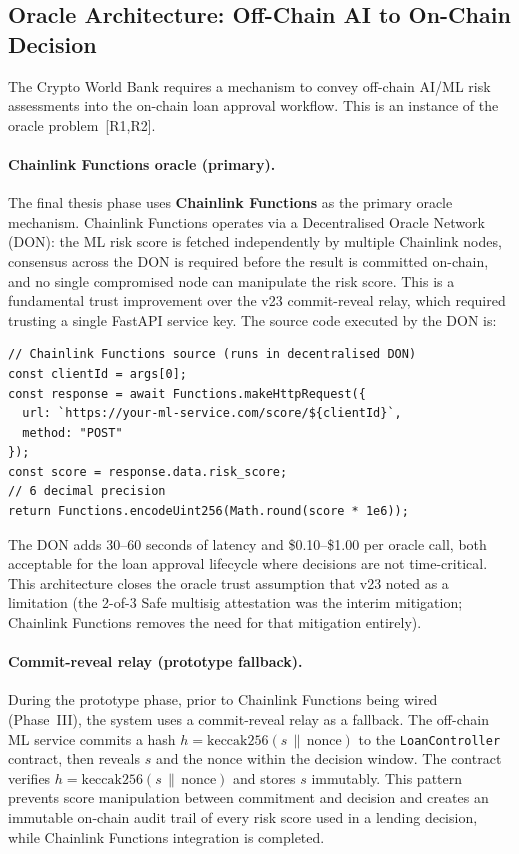 \documentclass[12pt,a4paper]{report}
\begin{document}
\subsection{Oracle Architecture: Off-Chain AI to On-Chain Decision}
\label{sec:oracle-architecture}

The Crypto World Bank requires a mechanism to convey off-chain AI/ML risk assessments into the on-chain loan approval workflow. This is an instance of the oracle problem~[R1,R2].

\paragraph{Chainlink Functions oracle (primary).}
The final thesis phase uses \textbf{Chainlink Functions} as the primary oracle mechanism. Chainlink Functions operates via a Decentralised Oracle Network (DON): the ML risk score is fetched independently by multiple Chainlink nodes, consensus across the DON is required before the result is committed on-chain, and no single compromised node can manipulate the risk score. This is a fundamental trust improvement over the v23 commit-reveal relay, which required trusting a single FastAPI service key. The source code executed by the DON is:

\begin{verbatim}
// Chainlink Functions source (runs in decentralised DON)
const clientId = args[0];
const response = await Functions.makeHttpRequest({
  url: `https://your-ml-service.com/score/${clientId}`,
  method: "POST"
});
const score = response.data.risk_score;
// 6 decimal precision
return Functions.encodeUint256(Math.round(score * 1e6));
\end{verbatim}

The DON adds 30--60 seconds of latency and \$0.10--\$1.00 per oracle call, both acceptable for the loan approval lifecycle where decisions are not time-critical. This architecture closes the oracle trust assumption that v23 noted as a limitation (the 2-of-3 Safe multisig attestation was the interim mitigation; Chainlink Functions removes the need for that mitigation entirely).

\paragraph{Commit-reveal relay (prototype fallback).}
During the prototype phase, prior to Chainlink Functions being wired (Phase~III), the system uses a commit-reveal relay as a fallback. The off-chain ML service commits a hash $h = \text{keccak256}(s \,\|\, \text{nonce})$ to the \texttt{LoanController} contract, then reveals $s$ and the nonce within the decision window. The contract verifies $h = \text{keccak256}(s \,\|\, \text{nonce})$ and stores $s$ immutably. This pattern prevents score manipulation between commitment and decision and creates an immutable on-chain audit trail of every risk score used in a lending decision, while Chainlink Functions integration is completed.
\end{document}
